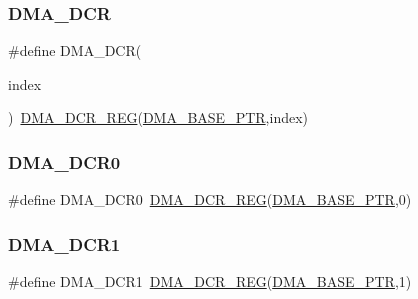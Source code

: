 \subsubsection{\texorpdfstring{D\+M\+A\+\_\+\+D\+CR}{DMA\_DCR}}
{\footnotesize\ttfamily \#define D\+M\+A\+\_\+\+D\+CR(\begin{DoxyParamCaption}\item[{}]{index }\end{DoxyParamCaption})~\hyperlink{group___d_m_a___register___accessor___macros_gae8a6edbedff5e645a72bea01af62b38b}{D\+M\+A\+\_\+\+D\+C\+R\+\_\+\+R\+EG}(\hyperlink{group___d_m_a___peripheral_ga6997fbc1b1973e9f27170217a3bd6f22}{D\+M\+A\+\_\+\+B\+A\+S\+E\+\_\+\+P\+TR},index)}

\mbox{\label{group___d_m_a___register___accessor___macros_gaf9babba3fbd87c9b8f6576debd40763c}} 
\subsubsection{\texorpdfstring{D\+M\+A\+\_\+\+D\+C\+R0}{DMA\_DCR0}}
{\footnotesize\ttfamily \#define D\+M\+A\+\_\+\+D\+C\+R0~\hyperlink{group___d_m_a___register___accessor___macros_gae8a6edbedff5e645a72bea01af62b38b}{D\+M\+A\+\_\+\+D\+C\+R\+\_\+\+R\+EG}(\hyperlink{group___d_m_a___peripheral_ga6997fbc1b1973e9f27170217a3bd6f22}{D\+M\+A\+\_\+\+B\+A\+S\+E\+\_\+\+P\+TR},0)}

\mbox{\label{group___d_m_a___register___accessor___macros_gae50b361d7562cbb227c52837d76186c3}} 
\subsubsection{\texorpdfstring{D\+M\+A\+\_\+\+D\+C\+R1}{DMA\_DCR1}}
{\footnotesize\ttfamily \#define D\+M\+A\+\_\+\+D\+C\+R1~\hyperlink{group___d_m_a___register___accessor___macros_gae8a6edbedff5e645a72bea01af62b38b}{D\+M\+A\+\_\+\+D\+C\+R\+\_\+\+R\+EG}(\hyperlink{group___d_m_a___peripheral_ga6997fbc1b1973e9f27170217a3bd6f22}{D\+M\+A\+\_\+\+B\+A\+S\+E\+\_\+\+P\+TR},1)}

